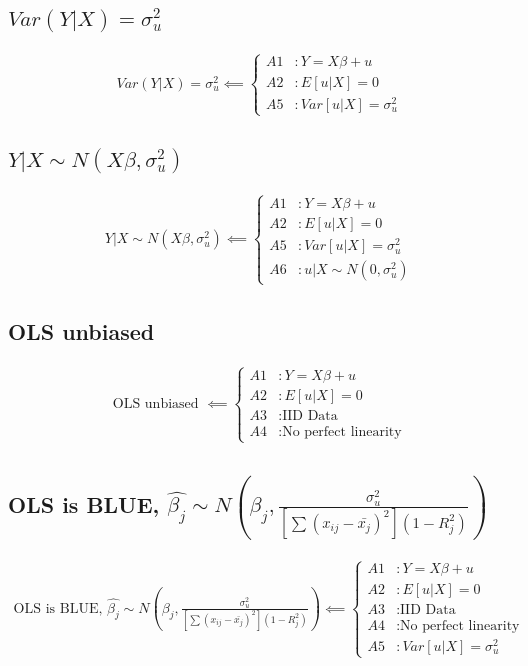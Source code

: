 \documentclass{article}
\theoremstyle{definition}
\theoremstyle{thrm}
\theoremstyle{lma}
\theoremstyle{ppst}
\theoremstyle{crlr}
\begin{document}
\subsection{$Var(Y|X) = \sigma_u^2$}
\begin{align*}
Var(Y|X) = \sigma_u^2 \impliedby
\begin{cases}
		A1 &: Y=X\beta+u\\
		A2 &:E[u|X] = 0\\
		A5 &: Var[u|X] = \sigma_u^2
\end{cases}
\end{align*}

\subsection{$Y|X \sim N(X\beta, \sigma_u^2)$}
\begin{align*}
Y|X \sim N(X\beta, \sigma_u^2) \impliedby
\begin{cases}
		A1 &: Y=X\beta+u\\
		A2 &:E[u|X] = 0\\
		A5 &: Var[u|X] = \sigma_u^2\\
		A6 &: u|X\sim N(0,\sigma_u^2)
\end{cases}
\end{align*}

\subsection{OLS unbiased}
\begin{align*}
\text{OLS unbiased }\impliedby
\begin{cases}
		A1 &: Y=X\beta+u\\
		A2 &:E[u|X] = 0\\
		A3 &: \text{IID Data}\\
		A4&: \text{No perfect linearity}
\end{cases}
\end{align*}
\subsection{OLS is BLUE, $\hat{\beta_j}\sim N(\beta_j, \frac{\sigma_u^2}{[\sum(x_{ij}-\bar{x_j})^2](1-R_j^2)})$}
\begin{align*}
\text{OLS is BLUE, }\hat{\beta_j}\sim N(\beta_j, \frac{\sigma_u^2}{[\sum(x_{ij}-\bar{x_j})^2](1-R_j^2)}) \impliedby
\begin{cases}
		A1 &: Y=X\beta+u\\
		A2 &:E[u|X] = 0\\
		A3 &: \text{IID Data}\\
		A4 &: \text{No perfect linearity}\\
		A5 &: Var[u|X] = \sigma_u^2
\end{cases}
\end{align*}
\end{document}
